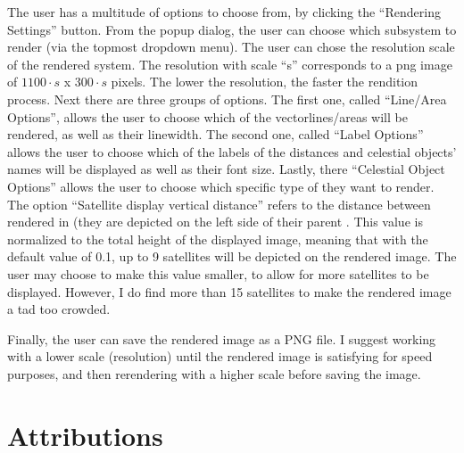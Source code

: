 \documentclass[letterpaper,10pt,english]{sphinxmanual}
\begin{document}
\sphinxAtStartPar
The user has a multitude of options to choose from, by clicking the “Rendering Settings”
button. From the pop\sphinxhyphen{}up dialog, the user can choose which sub\sphinxhyphen{}system to render (via the
top\sphinxhyphen{}most drop\sphinxhyphen{}down menu).
The user can chose the resolution scale of the rendered system. The resolution with
scale “s” corresponds to a png image of \(1100 \cdot s\) x \(300 \cdot s\)
pixels. The lower the resolution, the faster the rendition process.
Next there are three groups of options. The first one, called “Line/Area Options”,
allows the user to choose which of the vector\sphinxhyphen{}lines/areas will be rendered, as
well as their line\sphinxhyphen{}width.
The second one, called “Label Options” allows the user to choose which of the labels
of the distances and celestial objects’ names will be displayed as well as their font size.
Lastly, there “Celestial Object Options” allows the user to choose which specific type of
{\hyperref[\detokenize{celestial_bodies/celestial_bodies:id1}]{}} they want to render. The option
“Satellite display vertical distance” refers to the distance between rendered {\hyperref[\detokenize{celestial_bodies/satellite:id1}]{}}
in {\hyperref[\detokenize{celestial_systems/stellar_system:id1}]{}} (they are depicted on the
left side of their parent {\hyperref[\detokenize{celestial_bodies/planet:id1}]{}}. This value is normalized to the total height of the displayed image,
meaning that with the default value of 0.1, up to 9 satellites will be depicted on the rendered image.
The user may choose to make this value smaller, to allow for more satellites to be displayed.
However, I do find more than 15 satellites to make the rendered image a tad too crowded.

\sphinxAtStartPar
Finally, the user can save the rendered image as a PNG file. I suggest working with a lower scale (resolution)
until the rendered image is satisfying for speed purposes, and then re\sphinxhyphen{}rendering with a higher scale before
saving the image.


\chapter{Attributions}
\label{\detokenize{attributions/attributions:attributions}}\label{\detokenize{attributions/attributions::doc}}
\end{document}
